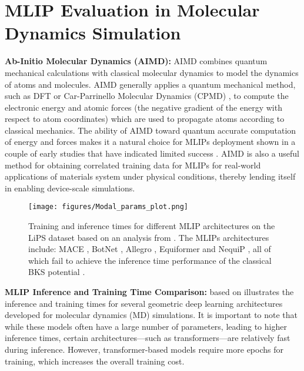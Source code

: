 \appendix
\onecolumn

\section{MLIP Evaluation in Molecular Dynamics Simulation} \label{app:aimd}

\textbf{Ab-Initio Molecular Dynamics (AIMD):} AIMD combines quantum mechanical calculations with classical molecular dynamics to model the dynamics of atoms and molecules. AIMD generally applies a quantum mechanical method, such as DFT or Car-Parrinello Molecular Dynamics (CPMD) \citep{car1985unified}, to compute the electronic energy and atomic forces (the negative gradient of the energy with respect to atom coordinates) which are used to propagate atoms according to classical mechanics. The ability of AIMD toward quantum accurate computation of energy and forces makes it a natural choice for MLIPs deployment shown in a couple of early studies that have indicated limited success \citep{fuforces, bihani2024egraffbench}. AIMD is also a useful method for obtaining correlated training data for MLIPs for real-world applications of materials system under physical conditions, thereby lending itself in enabling device-scale simulations.


\begin{figure}[hbp]
     \vspace{-0.2cm}
    \centering
    \texttt{[image: figures/Modal\_params\_plot.png]}
    \caption{Training and inference times for different MLIP architectures on the LiPS dataset based on an analysis from \citet{bihani2024egraffbench}. The MLIPs architectures include: MACE \citep{batatia2023foundation}, BotNet \citep{batatia2025design}, Allegro \citep{musaelian2023learning}, Equiformer \citep{liao2023equiformer} and NequiP \citep{batzner20223}, all of which fail to achieve the inference time performance of the classical BKS potential \citep{van1990force}.}
    \label{fig:model_scaling}
\end{figure}


\textbf{MLIP Inference and Training Time Comparison:}  based on \citet{bihani2024egraffbench} illustrates the inference and training times for several geometric deep learning architectures developed for molecular dynamics (MD) simulations. It is important to note that while these models often have a large number of parameters, leading to higher inference times, certain architectures—such as transformers—are relatively fast during inference. However, transformer-based models require more epochs for training, which increases the overall training cost.


